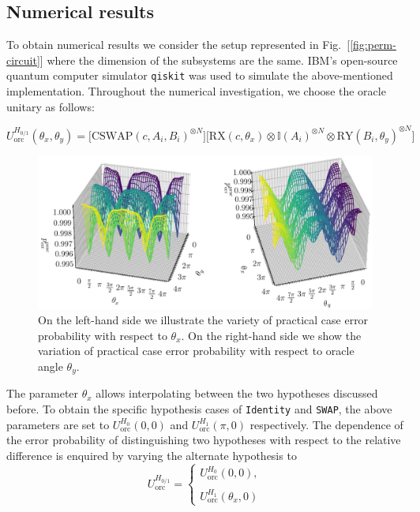 \documentclass[%
 aps,
 jmp,%
 amsmath,amssymb,
 reprint,%
]{revtex4-2}
\begin{document}
\newpage
\subsection{Numerical results}

To obtain numerical results we consider the setup represented in Fig.~[\ref{fig:perm-circuit}] where the dimension of the subsystems are the same.
IBM's open-source quantum computer simulator \texttt{qiskit} was used to simulate the above-mentioned implementation.
Throughout the numerical investigation, we choose the oracle unitary as follows:

\begin{widetext}
\begin{equation}
U_\textrm{orc}^{H_{0/1}}(\theta_x,\theta_y) = 
\big[\textrm{CSWAP}(c,A_i,B_i)^{\otimes N}\big]
\big[\textrm{RX}(c,\theta_x)\otimes\mathbb{I}(A_i)^{\otimes N}\otimes \textrm{RY}(B_i,\theta_y)^{\otimes N}\big]
\label{eq:oracles}
\end{equation}
\end{widetext}
\begin{figure}[tbh!]
	\centering
	\includegraphics[width = \linewidth]{practical_case_error_prob-crop.pdf}
	\caption{On the left-hand side we illustrate the variety of practical case error probability with respect to $\theta_x$. On the right-hand side we show the variation of practical case error probability with respect to oracle angle $\theta_y$.}
	\label{fig:practical-case-error-plot}
\end{figure}

The parameter $\theta_x$ allows interpolating between the two hypotheses discussed before.
To obtain the specific hypothesis cases of \texttt{Identity} and \texttt{SWAP}, the above parameters are set to $U_\textrm{orc}^{H_{0}}(0,0)$ and $U_\textrm{orc}^{H_{1}}(\pi,0)$ respectively.
The dependence of the error probability of distinguishing two hypotheses with respect to the relative difference is enquired by varying the alternate hypothesis to
\begin{equation}
U_\textrm{orc}^{H_{0/1}} = 
\begin{cases}
U_\textrm{orc}^{H_{0}}(0,0), \\\\
U_\textrm{orc}^{H_{1}}(\theta_x,0)
\end{cases}
\label{eq:alternate-hypothesis-theta-x}
\end{equation}
\end{document}
